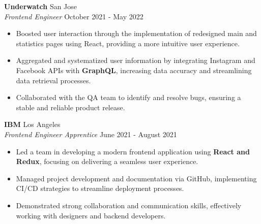 \documentclass[a4paper,10pt]{article}
\begin{document}
\vspace{3mm}

\noindent \textbf{Underwatch} \hfill {San Jose}\\
\textit{Frontend Engineer} \hfill {October 2021 - May 2022}\vspace{-\baselineskip}
\vspace{2.5mm}
\begin{itemize}
    \item Boosted user interaction through the implementation of redesigned main and statistics pages using React, providing a more intuitive user experience.\vspace{0.3ex}
    \item Aggregated and systematized user information by integrating Instagram and Facebook APIs with \textbf{GraphQL}, increasing data accuracy and streamlining data retrieval processes.\vspace{0.3ex}
    \item Collaborated with the QA team to identify and resolve bugs, ensuring a stable and reliable product release.\vspace{0.3ex}
\end{itemize}

\vspace{3mm}

\noindent \textbf{IBM} \hfill {Los Angeles}\\
\textit{Frontend Engineer Apprentice} \hfill {June 2021 - August 2021}\vspace{-\baselineskip}
\vspace{2.5mm}
\begin{itemize}
    \item Led a team in developing a modern frontend application using \textbf{React and Redux}, focusing on delivering a seamless user experience.\vspace{0.3ex}
    \item Managed project development and documentation via GitHub, implementing CI/CD strategies to streamline deployment processes.\vspace{0.3ex}
    \item Demonstrated strong collaboration and communication skills, effectively working with designers and backend developers.\vspace{0.3ex}
\end{itemize}

\vspace{3mm}
\end{document}
